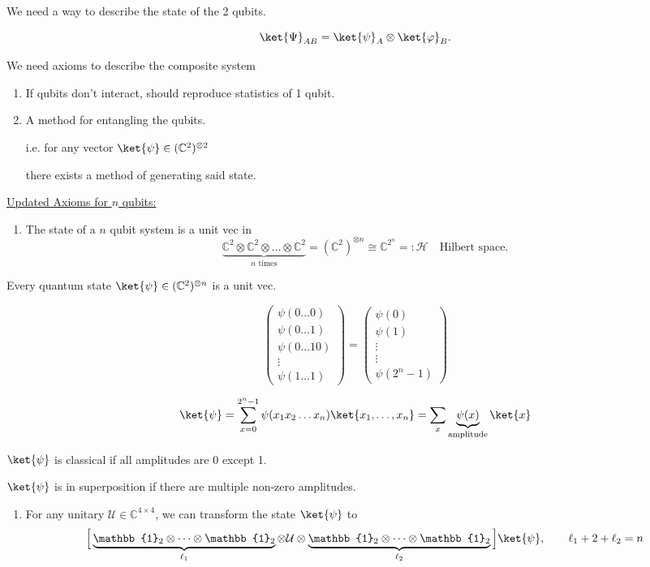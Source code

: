 \documentclass[11pt]{article}
\begin{document}
We need a way to describe the state of the 2 qubits.

\[
\ket{\Psi}_{AB} = \ket{\psi}_A \otimes \ket{\varphi}_B.
\]

We need axioms to describe the composite system
\begin{enumerate}
    \item[\textcircled{1}] If qubits don't interact, should reproduce statistics of 1 qubit.
    \item[\textcircled{2}] A method for entangling the qubits.

    i.e. for any vector $\ket{\psi} \in (\mathbb{C}^2)^{\otimes 2}$

    there exists a method of generating said state.
\end{enumerate}

\underline{Updated Axioms for $n$ qubits:}
\begin{enumerate}
    \item[\textcircled{1}] The state of a $n$ qubit system is a unit vec in
    \[
    \underbrace{\mathbb{C}^2 \otimes \mathbb{C}^2 \otimes \dots \otimes \mathbb{C}^2}_{n \text{ times}} = (\mathbb{C}^2)^{\otimes n} \cong \mathbb{C}^{2^n} =: \mathcal{H} \quad \text{Hilbert space.}
    \]
\end{enumerate}

Every quantum state $\ket{\psi} \in (\mathbb{C}^2)^{\otimes n}$ is a unit vec.

\[
\begin{pmatrix} \psi(0\dots0) \\ \psi(0\dots1) \\ \psi(0\dots10) \\ \vdots \\ \psi(1\dots1) \end{pmatrix}
=
\begin{pmatrix} \psi(0) \\ \psi(1) \\ \vdots \\ \vdots \\ \psi(2^n-1) \end{pmatrix}
\]

\[
\ket{\psi} = \sum_{x=0}^{2^n-1} \psi(x_1x_2\dots x_n)\ket{x_1,\dots,x_n} = \sum_x \underbrace{\psi(x)}_{\text{amplitude}}\ket{x}
\]

$\ket{\psi}$ is classical if all amplitudes are 0 except 1.

$\ket{\psi}$ is in superposition if there are multiple non-zero amplitudes.

\begin{enumerate}
    \item[\textcircled{2}] For any unitary $\mathcal{U} \in \mathbb{C}^{4\times4}$, we can transform the state $\ket{\psi}$ to
    \[
    \Big[\underbrace{\mathbb{1}_2 \otimes \dots \otimes \mathbb{1}_2}_{\ell_1} \otimes \mathcal{U} \otimes \underbrace{\mathbb{1}_2\otimes\dots\otimes\mathbb{1}_2}_{\ell_2}\Big]\ket{\psi}, \qquad \ell_1 + 2 + \ell_2 = n
    \]
\end{enumerate}
\end{document}
